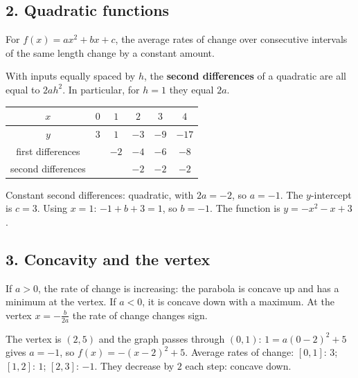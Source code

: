 \subsection*{2. Quadratic functions}
For $f(x)=ax^2+bx+c$, the average rates of change over consecutive intervals of the same length change by a constant amount.
\begin{keyidea}
With inputs equally spaced by $h$, the \textbf{second differences} of a quadratic are all equal to $2ah^2$. In particular, for $h=1$ they equal $2a$.
\end{keyidea}

\begin{example}
\begin{center}\begin{tabular}{c|ccccc}$x$&$0$&$1$&$2$&$3$&$4$\\\hline$y$&$3$&$1$&$-3$&$-9$&$-17$\\\hline first differences&&$-2$&$-4$&$-6$&$-8$\\ second differences&&&$-2$&$-2$&$-2$\end{tabular}\end{center}
\sol Constant second differences: quadratic, with $2a=-2$, so $a=-1$. The $y$-intercept is $c=3$. Using $x=1$: $-1+b+3=1$, so $b=-1$. The function is $y=-x^2-x+3$.
\end{example}

\subsection*{3. Concavity and the vertex}
If $a>0$, the rate of change is increasing: the parabola is concave up and has a minimum at the vertex. If $a<0$, it is concave down with a maximum. At the vertex $x=-\frac{b}{2a}$ the rate of change changes sign.

\begin{example}
\begin{center}
\end{center}
\sol The vertex is $(2,5)$ and the graph passes through $(0,1)$: $1=a(0-2)^2+5$ gives $a=-1$, so $f(x)=-(x-2)^2+5$. Average rates of change: $[0,1]$: $3$; $[1,2]$: $1$; $[2,3]$: $-1$. They decrease by $2$ each step: concave down.
\end{example}

